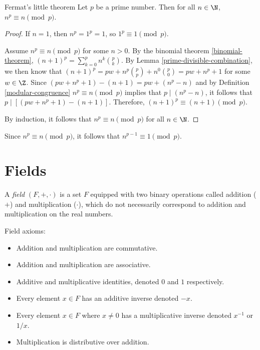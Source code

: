 \documentclass[12pt]{article}
\begin{document}
\begin{thm}{Fermat's little theorem}\label{fermat-little-theorem}\proofbreak
    Let $p$ be a prime number. Then for all $n \in \N$, $n^p \equiv n \pmod p$.
\end{thm}

\begin{proof}
    If $n = 1$, then $n^p = 1^p = 1$, so $1^p \equiv 1 \pmod p$.

    Assume $n^p \equiv n \pmod p$ for some $n > 0$. By the binomial theorem \ref{binomial-theorem}, $(n+1)^p = \sum_{k=0}^pn^k{p \choose k}$. By Lemma \ref{prime-divisible-combination}, we then know that $(n+1)^p = pw + n^p{p \choose p} + n^0{p \choose 0} = pw + n^p + 1$ for some $w \in \Z$. Since $(pw + n^p + 1) - (n + 1) = pw + (n^p - n)$ and by Definition \ref{modular-congruence} $n^p \equiv n \pmod p$ implies that $p \mid (n^p - n)$, it follows that $p \mid \left[(pw + n^p + 1) - (n + 1)\right]$. Therefore, $(n+1)^p \equiv (n+1) \pmod p$.

    By induction, it follows that $n^p \equiv n \pmod p$ for all $n \in \N$.
\end{proof}

\begin{cor}\label{fermat-little-corallary}
    Since $n^p \equiv n \pmod p$, it follows that $n^{p-1} \equiv 1 \pmod p$.
\end{cor}

\section{Fields}

\begin{defn}
    A \emph{field} $(F, +, \cdot)$ is a set $F$ equipped with two binary operations called addition ($+$) and multiplication ($\cdot$), which do not necessarily correspond to addition and multiplication on the real numbers.

    Field axioms:
    \begin{itemize}
        \item Addition and multiplication are commutative.
        \item Addition and multiplication are associative.
        \item Additive and multiplicative identities, denoted $0$ and $1$ respectively.
        \item Every element $x \in F$ has an additive inverse denoted $-x$.
        \item Every element $x \in F$ where $x \neq 0$ has a multiplicative inverse denoted $x^{-1}$ or $1/x$.
        \item Multiplication is distributive over addition.
    \end{itemize}
\end{defn}
\end{document}
